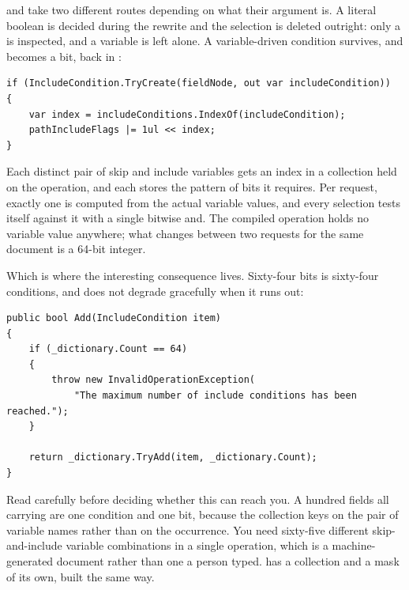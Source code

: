  and  take two different routes depending on what
their argument is. A literal boolean is decided during the rewrite and the
selection is deleted outright: only a  is inspected, and
a variable is left alone. A variable-driven condition survives, and becomes a
bit, back in :

\begin{verbatim}
if (IncludeCondition.TryCreate(fieldNode, out var includeCondition))
{
    var index = includeConditions.IndexOf(includeCondition);
    pathIncludeFlags |= 1ul << index;
}
\end{verbatim}

%
Each distinct pair of skip and include variables gets an index in a collection
held on the operation, and each  stores the pattern of bits it
requires. Per request, exactly one  is computed from the actual
variable values, and every selection tests itself against it with a single
bitwise and. The compiled operation holds no variable value anywhere; what
changes between two requests for the same document is a 64-bit integer.

%
Which is where the interesting consequence lives. Sixty-four bits is sixty-four
conditions, and  does not degrade gracefully
when it runs out:

\begin{verbatim}
public bool Add(IncludeCondition item)
{
    if (_dictionary.Count == 64)
    {
        throw new InvalidOperationException(
            "The maximum number of include conditions has been reached.");
    }

    return _dictionary.TryAdd(item, _dictionary.Count);
}
\end{verbatim}

Read  carefully before deciding whether this can reach you. A
hundred fields all carrying  are one condition and one
bit, because the collection keys on the pair of variable names rather than on
the occurrence. You need sixty-five different skip-and-include variable
combinations in a single operation, which is a machine-generated document rather
than one a person typed.  has a collection and a mask of its
own, built the same way.

